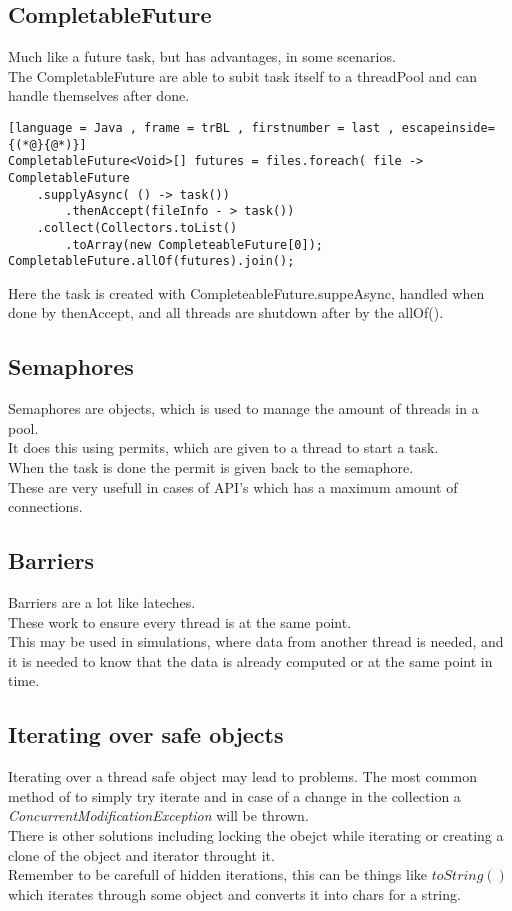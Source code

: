 \documentclass[12pt, a4paper]{article}
\begin{document}
		\subsection{CompletableFuture}
			Much like a future task, but has advantages, in some scenarios.\\
			The CompletableFuture are able to subit task itself to a threadPool and can handle themselves after done.\\
			
	\begin{lstlisting}[language = Java , frame = trBL , firstnumber = last , escapeinside={(*@}{@*)}]
CompletableFuture<Void>[] futures = files.foreach( file -> CompletableFuture
	.supplyAsync( () -> task())
		.thenAccept(fileInfo - > task())
	.collect(Collectors.toList()
		.toArray(new CompleteableFuture[0]);
CompletableFuture.allOf(futures).join();
			\end{lstlisting}
			Here the task is created with CompleteableFuture.suppeAsync, handled when done by thenAccept, and all threads are shutdown after by the allOf().
		\subsection{Semaphores}
			Semaphores are objects, which is used to manage the amount of threads in a pool.\\
			It does this using permits, which are given to a thread to start a task.\\
			When the task is done the permit is given back to the semaphore.\\
			These are very usefull in cases of API's which has a maximum amount of connections.
		\subsection{Barriers}
			Barriers are a lot like lateches.\\
			These work to ensure every thread is at the same point.\\
			This may be used in simulations, where data from another thread is needed, and it is needed to know that the data is already computed or at the same point in time.
		\subsection{Iterating over safe objects}
			Iterating over a thread safe object may lead to problems. The most common method of to simply try iterate and in case of a change in the collection a \textit{ConcurrentModificationException} will be thrown.\\
			There is other solutions including locking the obejct while iterating or creating a clone of the object and iterator throught it.\\
			Remember to be carefull of hidden iterations, this can be things like $toString()$ which iterates through some object and converts it into chars for a string.
\end{document}
